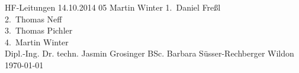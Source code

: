 \TUHeader                          %
{HF-Leitungen}                       %
{14.10.2014}                        %
{05}                            %
{Martin Winter}                   %
{
1.~Daniel Freßl\\
2.~Thomas Neff\\                    %
3.~Thomas Pichler \\ 
4.~Martin Winter \\                 %
}
{Dipl.-Ing. Dr. techn. Jasmin Grosinger BSc.}
{Barbara Süsser-Rechberger}                          %
{Wildon}                              %
{\today}                            %




\pagebreak
  
\tableofcontents
  
\pagebreak